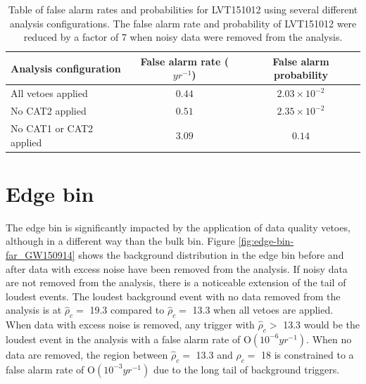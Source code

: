 \begin{table}[!ht]%
  \begin{center}
    \begin{tabular}{lcc}
      \hline
      Analysis configuration & False alarm rate ($yr^{-1}$) & False alarm probability \\ \hline
      All vetoes applied & $0.44$ & $2.03\times10^{-2}$ \\
      No CAT2 applied & $0.51$ & $2.35\times10^{-2}$ \\
      No CAT1 or CAT2 applied & $3.09$ & $0.14$ \\
      \hline
    \end{tabular}
  \end{center}
  \caption[LVT150914 FAR]{Table of false alarm rates and probabilities for LVT151012 using several %
           different analysis %
           configurations. The false alarm rate and probability of LVT151012 were reduced by a %
           factor of 7 when noisy data were removed from the analysis.}
  \label{table:151012-far}
\end{table}

\section{Edge bin}\label{sec:edge-bin}

The edge bin is significantly impacted by the application of data quality vetoes, although in a
different way than the bulk bin. Figure \ref{fig:edge-bin-far_GW150914} shows the background
distribution in the edge bin before and after data with excess noise have been removed from the analysis.
If noisy data are not removed from the analysis, there is
a noticeable extension of the tail of loudest events. The loudest background event with no data
removed from the analysis is at $\hat{\rho}_{c} =$ 19.3 compared to $\hat{\rho}_{c} =$ 13.3
when all vetoes are applied.
When data with excess noise is removed, any trigger with $\hat{\rho}_{c} >$ 13.3 would be the loudest event in
the analysis
with a false alarm rate of O$(10^{-6} yr^{-1})$. When no data are removed, the region between
$\hat{\rho}_{c} =$ 13.3 and
$\hat{\rho}_{c} =$ 18 is constrained to a false alarm rate of O$(10^{-3} yr^{-1})$ due to the long
tail of background triggers.

